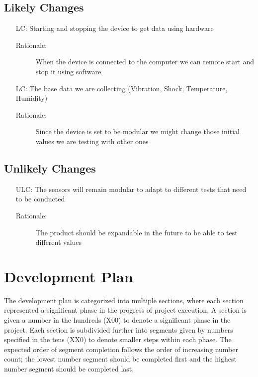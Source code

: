 \documentclass[12pt]{article}
\newcounter{lcnum} %
\newcounter{ulcnum}
\begin{document}
\subsection{Likely Changes}    

\noindent \begin{itemize}

\item[LC\refstepcounter{lcnum}\thelcnum\label{LC_meaningfulLabel}:] Starting and stopping the device to get data using hardware
\begin{description} \item[Rationale:] When the device is connected to the computer we can remote start and stop it using software \end{description}

\item[LC\refstepcounter{lcnum}\thelcnum\label{LC_meaningfulLabel}:] The base data we are collecting (Vibration, Shock, Temperature, Humidity)
\begin{description} \item[Rationale:] Since the device is set to be modular we might change those initial values we are testing with other ones \end{description}


\end{itemize}

\subsection{Unlikely Changes}    

\noindent \begin{itemize}

\item[ULC\refstepcounter{ulcnum}\theulcnum:] The sensors will remain modular to adapt to different tests that need to be conducted
\begin{description} \item[Rationale:] The product should be expandable in the future to be able to test different values \end{description}

\end{itemize}

\section{Development Plan}

The development plan is categorized into multiple sections, where each section represented a significant phase in the progress of project execution. A section is given a number in the hundreds (X00) to denote a significant phase in the project. Each section is subdivided further into segments given by numbers specified in the tens (XX0) to denote smaller steps within each phase. The expected order of segment completion follows the order of increasing number count; the lowest number segment should be completed first and the highest number segment should be completed last.\\
\end{document}
